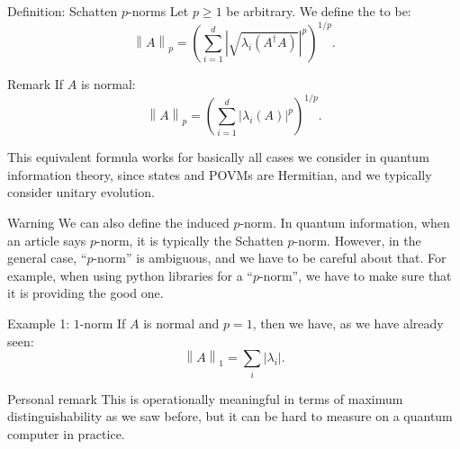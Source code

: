 \documentclass[a4paper]{article}
\begin{document}
\begin{parag}{Definition: Schatten $p$-norms}
    Let $p \geq 1$ be arbitrary. We define the  to be: 
    \[\left\|A\right\|_p = \left(\sum_{i=1}^{d} \left|\sqrt{\lambda_i\left(A^{\dagger} A\right)}\right|^p\right)^{1/p}.\]

    \begin{subparag}{Remark}
        If $A$ is normal: 
        \[\left\|A\right\|_p = \left(\sum_{i=1}^{d} \left|\lambda_i\left(A\right)\right|^p\right)^{1/p}.\]

        This equivalent formula works for basically all cases we consider in quantum information theory, since states and POVMs are Hermitian, and we typically consider unitary evolution.
    \end{subparag}

    \begin{subparag}{Warning}
        We can also define the induced $p$-norm. In quantum information, when an article says $p$-norm, it is typically the Schatten $p$-norm. However, in the general case, ``$p$-norm'' is ambiguous, and we have to be careful about that. For example, when using python libraries for a ``$p$-norm'', we have to make sure that it is providing the good one.
    \end{subparag}
\end{parag}

\begin{parag}{Example 1: $1$-norm}
    If $A$ is normal and $p = 1$, then we have, as we have already seen: 
    \[\left\|A\right\|_1 = \sum_{i} \left|\lambda_i\right|.\]

    \begin{subparag}{Personal remark}
        This is operationally meaningful in terms of maximum distinguishability as we saw before, but it can be hard to measure on a quantum computer in practice. 
    \end{subparag} 
\end{parag}
\end{document}
